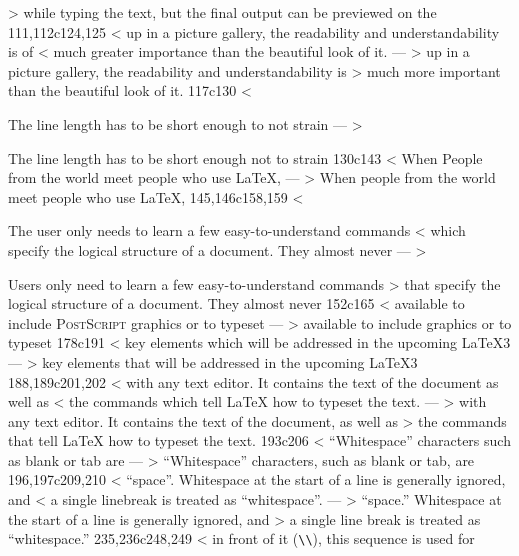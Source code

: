 > while typing the text, but the final output can be previewed on the
111,112c124,125
< up in a picture gallery, the readability and understandability is of
< much greater importance than the beautiful look of it.
---
> up in a picture gallery, the readability and understandability is 
> much more important than the beautiful look of it.
117c130
< \item The line length has to be short enough to not strain
---
> \item The line length has to be short enough not to strain
130c143
< When People from the  world meet people who use \LaTeX{},
---
> When people from the  world meet people who use \LaTeX{},
145,146c158,159
< \item The user only needs to learn a few easy-to-understand commands
<   which specify the logical structure of a document. They almost never
---
> \item Users only need to learn a few easy-to-understand commands
>   that specify the logical structure of a document. They almost never
152c165
<   available to include \textsc{PostScript} graphics or to typeset
---
>   available to include \PSi{} graphics or to typeset
178c191
<     key elements which will be addressed in the upcoming \LaTeX 3
---
>     key elements that will be addressed in the upcoming \LaTeX 3
188,189c201,202
< with any text editor. It contains the text of the document as well as
< the commands which tell \LaTeX{} how to typeset the text.
---
> with any text editor. It contains the text of the document, as well as
> the commands that tell \LaTeX{} how to typeset the text.
193c206
< ``Whitespace'' characters such as blank or tab are
---
> ``Whitespace'' characters, such as blank or tab, are
196,197c209,210
< ``space''.  Whitespace at the start of a line is generally ignored, and
< a single linebreak is treated as ``whitespace''.
---
> ``space.''  Whitespace at the start of a line is generally ignored, and
> a single line break is treated as ``whitespace.''
235,236c248,249
< in front of it (\verb|\\|), this sequence is used for
